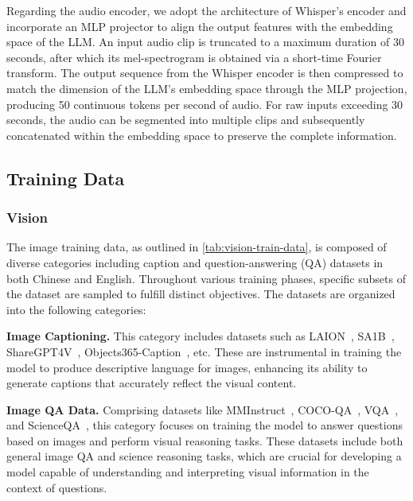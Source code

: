  Regarding the audio encoder, we adopt the architecture of Whisper's encoder and incorporate an MLP projector to align the output features with the embedding space of the LLM. An input audio clip is truncated to a maximum duration of 30 seconds, after which its mel-spectrogram is obtained via a short-time Fourier transform. The output sequence from the Whisper encoder is then compressed to match the dimension of the LLM's embedding space through the MLP projection, producing 50 continuous tokens per second of audio. For raw inputs exceeding 30 seconds, the audio can be segmented into multiple clips and subsequently concatenated within the embedding space to preserve the complete information.

 
\subsection{Training Data}



\subsubsection{Vision}

The image training data, as outlined in \autoref{tab:vision-train-data}, is composed of diverse categories including caption and question-answering (QA) datasets in both Chinese and English. Throughout various training phases, specific subsets of the dataset are sampled to fulfill distinct objectives. The datasets are organized into the following categories:

\textbf{Image Captioning.} This category includes datasets such as LAION~\cite{schuhmann2022laion}, SA1B~\cite{kirillov2023segany}, ShareGPT4V~\cite{chen2024sharegpt4videoimprovingvideounderstanding}, Objects365-Caption~\cite{shao2019objects365}, etc. These are instrumental in training the model to produce descriptive language for images, enhancing its ability to generate captions that accurately reflect the visual content.

\textbf{Image QA Data.} Comprising datasets like MMInstruct~\cite{liu2024mminstruct}, COCO-QA~\cite{ren2015cocoqa}, VQA~\cite{antol2015vqa}, and ScienceQA~\cite{lu2022scienceqa}, this category focuses on training the model to answer questions based on images and perform visual reasoning tasks. These datasets include both general image QA and science reasoning tasks, which are crucial for developing a model capable of understanding and interpreting visual information in the context of questions.

